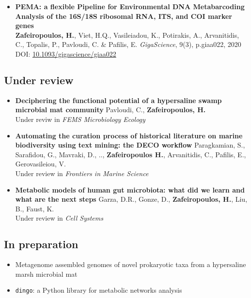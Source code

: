 \begin{itemize}
      \item{
         \textbf{PEMA: a flexible Pipeline for Environmental DNA Metabarcoding Analysis of the 16S/18S ribosomal RNA, ITS, and COI marker genes} \\ 
         \textbf{Zafeiropoulos, H.}, Viet, H.Q., Vasileiadou, K., Potirakis, A., Arvanitidis, C., Topalis, P., Pavloudi, C. \& Pafilis, E. \textit{GigaScience}, 9(3), p.giaa022, 2020
         DOI: \href{https://doi.org/10.1093/gigascience/giaa022}{10.1093/gigascience/giaa022}
      }

   \end{itemize}


\subsection*{Under review}

   \begin{itemize}
      \item {
         \textbf{Deciphering the functional potential of a hypersaline swamp microbial mat community}
         Pavloudi, C., \textbf{Zafeiropoulos, H.} \\
         Under reviw in \textit{FEMS Microbiology Ecology}
         }
      \item {
         \textbf{Automating the curation process of historical literature on marine biodiversity using text mining: the DECO workflow}
         }
         Paragkamian, S., Sarafidou, G., Mavraki, D., .., \textbf{Zafeiropoulos H.}, Arvanitidis, C., Pafilis, E., Gerovasileiou, V. \\
         Under review in \textit{Frontiers in Marine Science}
      \item{
         \textbf{Metabolic models of human gut microbiota: what did we learn and what are the next steps}
      }  Garza, D.R., Gonze, D., \textbf{Zafeiropoulos, H.}, Liu, B., Faust, K. \\
      Under review in \textit{Cell Systems}
      
   \end{itemize}


\subsection*{In preparation}

   \begin{itemize}
      \item Metagenome assembled genomes of novel prokaryotic taxa from a hypersaline marsh microbial mat

      \item \texttt{dingo}: a Python library for metabolic networks analysis 
   \end{itemize}





